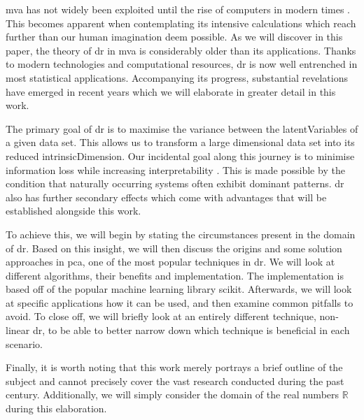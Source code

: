 \Gls{mva} has not widely been exploited until the rise of computers in modern times \cite{Jolliffe2002book}.
This becomes apparent when contemplating its intensive calculations which reach further than our human imagination deem possible.
As we will discover in this paper, the theory of \gls{dr} in \gls{mva} is considerably older than its applications.
Thanks to modern technologies and computational resources, \gls{dr} is now well entrenched in most statistical applications.
Accompanying its progress, substantial revelations have emerged in recent years which we will elaborate in greater detail in this work.
\bigskip


The primary goal of \gls{dr} is to maximise the variance between the \glspl{latentVariable} of a given data set.
This allows us to transform a large dimensional data set into its reduced \gls{intrinsicDimension}.
Our incidental goal along this journey is to minimise information loss while increasing interpretability \cite{jolliffe2016principal}.
This is made possible by the condition that naturally occurring systems often exhibit dominant patterns.
\Gls{dr} also has further secondary effects which come with advantages that will be established alongside this work.
\medskip

To achieve this, we will begin by stating the circumstances present in the domain of \gls{dr}.
Based on this insight, we will then discuss the origins and some solution approaches in \gls{pca}, one of the most popular techniques in \gls{dr}.
We will look at different algorithms, their benefits and implementation.
The implementation is based off of the popular machine learning library \gls{scikit}.
Afterwards, we will look at specific applications how it can be used, and then examine common pitfalls to avoid.
To close off, we will briefly look at an entirely different technique, non-linear \gls{dr}, to be able to better narrow down which technique is beneficial in each scenario.
\bigskip


Finally, it is worth noting that this work merely portrays a brief outline of the subject and cannot precisely cover the vast research conducted during the past century.
Additionally, we will simply consider the domain of the real numbers $\mathbb{R}$ during this elaboration.


